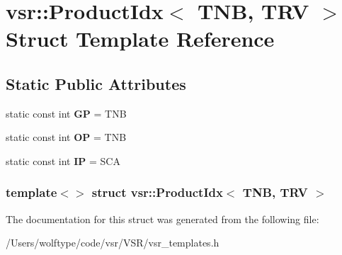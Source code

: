 \hypertarget{structvsr_1_1_product_idx_3_01_t_n_b_00_01_t_r_v_01_4}{\section{vsr\-:\-:Product\-Idx$<$ T\-N\-B, T\-R\-V $>$ Struct Template Reference}
\label{structvsr_1_1_product_idx_3_01_t_n_b_00_01_t_r_v_01_4}
}
\subsection*{Static Public Attributes}
\begin{DoxyCompactItemize}
\item 
\hypertarget{structvsr_1_1_product_idx_3_01_t_n_b_00_01_t_r_v_01_4_ab545cd37fab4f7bdac81de66ab936f56}{static const int {\bfseries G\-P} = T\-N\-B}\label{structvsr_1_1_product_idx_3_01_t_n_b_00_01_t_r_v_01_4_ab545cd37fab4f7bdac81de66ab936f56}

\item 
\hypertarget{structvsr_1_1_product_idx_3_01_t_n_b_00_01_t_r_v_01_4_adf56b8462c22c8684e1f820db00e080b}{static const int {\bfseries O\-P} = T\-N\-B}\label{structvsr_1_1_product_idx_3_01_t_n_b_00_01_t_r_v_01_4_adf56b8462c22c8684e1f820db00e080b}

\item 
\hypertarget{structvsr_1_1_product_idx_3_01_t_n_b_00_01_t_r_v_01_4_afcd38993df6cbeca13c71f33851a5c7e}{static const int {\bfseries I\-P} = S\-C\-A}\label{structvsr_1_1_product_idx_3_01_t_n_b_00_01_t_r_v_01_4_afcd38993df6cbeca13c71f33851a5c7e}

\end{DoxyCompactItemize}
\subsubsection*{template$<$$>$ struct vsr\-::\-Product\-Idx$<$ T\-N\-B, T\-R\-V $>$}



The documentation for this struct was generated from the following file\-:\begin{DoxyCompactItemize}
\item 
/\-Users/wolftype/code/vsr/\-V\-S\-R/vsr\-\_\-templates.\-h\end{DoxyCompactItemize}
